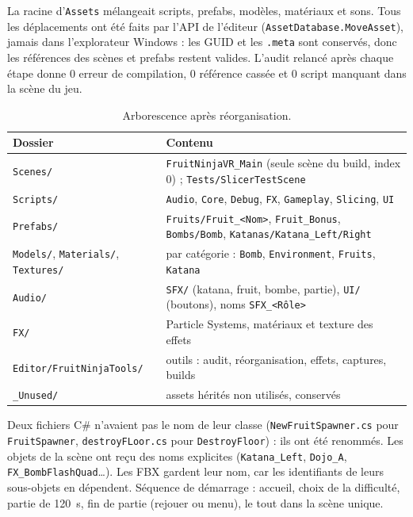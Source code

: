\documentclass[11pt,a4paper]{article}
\newcommand{\fichier}[1]{\texttt{\small #1}}
\begin{document}
La racine d'\texttt{Assets} mélangeait scripts, prefabs, modèles, matériaux et sons. Tous les
déplacements ont été faits par l'API de l'éditeur (\texttt{AssetDatabase.MoveAsset}), jamais dans
l'explorateur Windows : les GUID et les \texttt{.meta} sont conservés, donc les références des scènes et
prefabs restent valides. L'audit relancé après chaque étape donne 0 erreur de compilation, 0 référence
cassée et 0 script manquant dans la scène du jeu.

\begin{table}[H]
\centering\small
\caption{Arborescence après réorganisation.}
\begin{tabularx}{\textwidth}{@{}lL@{}}
\toprule
Dossier & Contenu \\
\midrule
\texttt{Scenes/} & \texttt{FruitNinjaVR\_Main} (seule scène du build, index 0) ; \texttt{Tests/SlicerTestScene} \\
\texttt{Scripts/} & \texttt{Audio}, \texttt{Core}, \texttt{Debug}, \texttt{FX}, \texttt{Gameplay}, \texttt{Slicing}, \texttt{UI} \\
\texttt{Prefabs/} & \texttt{Fruits/Fruit\_<Nom>}, \texttt{Fruit\_Bonus}, \texttt{Bombs/Bomb}, \texttt{Katanas/Katana\_Left/Right} \\
\texttt{Models/}, \texttt{Materials/}, \texttt{Textures/} & par catégorie : \texttt{Bomb}, \texttt{Environment}, \texttt{Fruits}, \texttt{Katana} \\
\texttt{Audio/} & \texttt{SFX/} (katana, fruit, bombe, partie), \texttt{UI/} (boutons), noms \texttt{SFX\_<Rôle>} \\
\texttt{FX/} & Particle Systems, matériaux et texture des effets \\
\texttt{Editor/FruitNinjaTools/} & outils : audit, réorganisation, effets, captures, builds \\
\texttt{\_Unused/} & assets hérités non utilisés, conservés \\
\bottomrule
\end{tabularx}
\end{table}

Deux fichiers C\# n'avaient pas le nom de leur classe (\fichier{NewFruitSpawner.cs} pour
\texttt{FruitSpawner}, \fichier{destroyFLoor.cs} pour \texttt{DestroyFloor}) : ils ont été renommés.
Les objets de la scène ont reçu des noms explicites (\texttt{Katana\_Left}, \texttt{Dojo\_A},
\texttt{FX\_BombFlashQuad}\ldots). Les FBX gardent leur nom, car les identifiants de leurs sous-objets en
dépendent. Séquence de démarrage : accueil, choix de la difficulté, partie de 120~s, fin de partie
(rejouer ou menu), le tout dans la scène unique.
\end{document}
